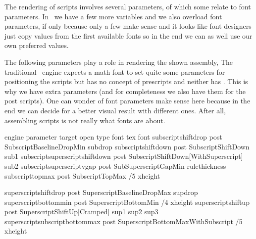 \startlinecorrection
{} {}
    {} {}
    {} {}
\stopcombination
\stoplinecorrection

The rendering of scripts involves several parameters, of which some relate to
font parameters. In \LUAMETATEX\ we have a few more variables and we also
overload font parameters, if only because only a few make sense and it looks like
font designers just copy values from the first available fonts so in the end we
can as well use our own preferred values.

The following parameters play a role in rendering the shown assembly, The
traditional \TEX\ engine expects a math font to set quite some parameters for
positioning the scripts but has no concept of prescripts and neither has
\OPENTYPE. This is why we have extra parameters (and for completeness we also
have them for the post scripts). One can wonder of font parameters make sense
here because in the end we can decide for a better visual result with different
ones. After all, assembling scripts is not really what fonts are about.

\starttabulate[||||||]
\FL
\BC engine parameter                                \BC target \BC open type font                      \BC tex font            \BC \NR
\TL
\NC                   subscriptshiftdrop            \NC post   \NC SubscriptBaselineDropMin            \NC subdrop             \NC \NR
\NC                   subscriptshiftdown            \NC post   \NC SubscriptShiftDown                  \NC sub1                \NC \NR
\NC                   subscriptsuperscriptshiftdown \NC post   \NC SubscriptShiftDown[WithSuperscript] \NC sub2                \NC \NR
\NC                   subscriptsuperscriptvgap      \NC post   \NC SubSuperscriptGapMin                   rulethickness   \NC \NR
\NC                   subscripttopmax               \NC post   \NC SubscriptTopMax                     /5 xheight         \NC \NR

\NC                   superscriptshiftdrop          \NC post   \NC SuperscriptBaselineDropMax          \NC supdrop             \NC \NR
\NC                   superscriptbottommin          \NC post   \NC SuperscriptBottomMin                /4 xheight         \NC \NR
\NC                   superscriptshiftup            \NC post   \NC SuperscriptShiftUp[Cramped]         \NC sup1 sup2 sup3      \NC \NR
\NC                   superscriptsubscriptbottommax \NC post   \NC SuperscriptBottomMaxWithSubscript   /5 xheight         \NC \NR

